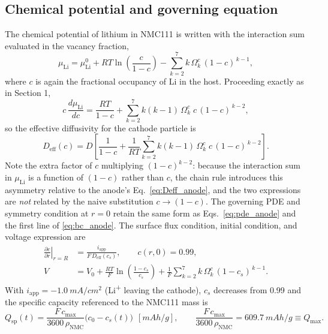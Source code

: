 \documentclass[11pt]{article}
\begin{document}
\subsection{Chemical potential and governing equation}
The chemical potential of lithium in NMC111 is written with the interaction sum evaluated in the vacancy fraction,
\begin{equation}
\mu_{\mathrm{Li}} = \mu_{\mathrm{Li}}^{0} + RT\ln\!\left(\frac{c}{1-c}\right) - \sum_{k=2}^{7} k\,\Omega_k^{c}\,(1-c)^{\,k-1},
\end{equation}
where $c$ is again the fractional occupancy of Li in the host. Proceeding exactly as in Section 1,
\begin{equation}
c\,\frac{d\mu_{\mathrm{Li}}}{dc} = \frac{RT}{1-c} + \sum_{k=2}^{7} k(k-1)\,\Omega_k^{c}\;c\,(1-c)^{\,k-2},
\end{equation}
so the effective diffusivity for the cathode particle is
\begin{equation}
D_{\mathrm{eff}}(c) = D\left[\frac{1}{1-c} + \frac{1}{RT}\sum_{k=2}^{7} k(k-1)\,\Omega_k^{c}\;c\,(1-c)^{\,k-2}\right].
\label{eq:Deff_cathode}
\end{equation}
Note the extra factor of $c$ multiplying $(1-c)^{k-2}$: because the interaction sum in $\mu_{\mathrm{Li}}$ is a
function of $(1-c)$ rather than $c$, the chain rule introduces this asymmetry relative to the anode's
Eq.~\eqref{eq:Deff_anode}, and the two expressions are \emph{not} related by the naive substitution $c\to(1-c)$.
The governing PDE and symmetry condition at $r=0$ retain the same form as Eqs.~\eqref{eq:pde_anode} and the first
line of \eqref{eq:bc_anode}. The surface flux condition, initial condition, and voltage expression are
\begin{align}
\left.\frac{\partial c}{\partial r}\right|_{r=R} &= \frac{i_{\mathrm{app}}}{F\,D_{\mathrm{eff}}(c_s)}, \qquad
c(r,0) = 0.99, \\[4pt]
V &= V_0 + \frac{RT}{F}\ln\!\left(\frac{1-c_s}{c_s}\right) + \frac{1}{F}\sum_{k=2}^{7} k\,\Omega_k^{c}\,(1-c_s)^{\,k-1}.
\label{eq:V_cathode}
\end{align}
With $i_{\mathrm{app}} = -1.0~\si{mA/cm^2}$ (Li\textsuperscript{+} leaving the cathode), $c_s$ decreases from 0.99 and
the specific capacity referenced to the NMC111 mass is
\begin{equation}
Q_{\mathrm{sp}}(t) = \frac{F\,c_{\max}}{3600\,\rho_{\mathrm{NMC}}}\big(c_0 - c_s(t)\big)\ \ [\si{mAh/g}],
\qquad
\frac{F\,c_{\max}}{3600\,\rho_{\mathrm{NMC}}} = \SI{609.7}{mAh/g} \equiv Q_{\max}.
\label{eq:Qsp}
\end{equation}
\end{document}
